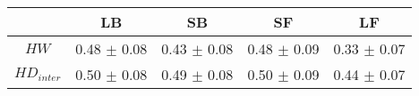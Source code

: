 \begin{tabular}{c c c c c }
\hline
 & LB & SB & SF & LF \\
\hline
$HW$ & 0.48 $\pm$ 0.08 & 0.43 $\pm$ 0.08 & 0.48 $\pm$ 0.09 & 0.33 $\pm$ 0.07 \\
$HD_{inter}$ & 0.50 $\pm$ 0.08 & 0.49 $\pm$ 0.08 & 0.50 $\pm$ 0.09 & 0.44 $\pm$ 0.07 \\
\hline
\end{tabular}